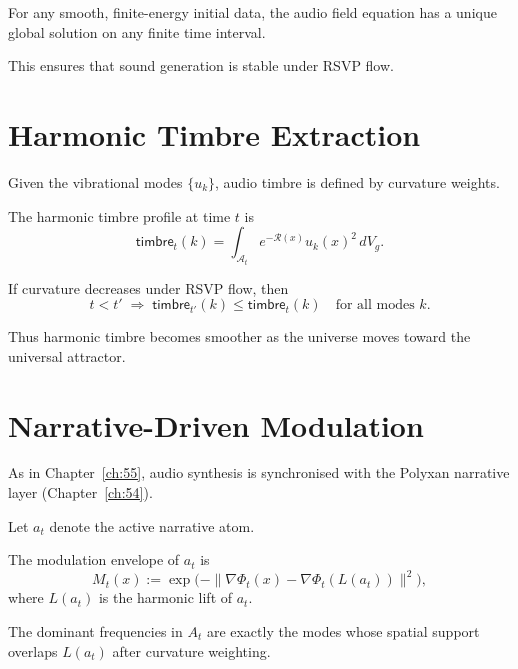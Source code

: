 \begin{theorem}
For any smooth, finite-energy initial data, the audio field equation has a
unique global solution on any finite time interval.
\end{theorem}

This ensures that sound generation is stable under RSVP flow.


\section{Harmonic Timbre Extraction}
\label{sec:56:timbre}

Given the vibrational modes $\{ u_k \}$, audio timbre is defined by curvature
weights.

\begin{definition}
The harmonic timbre profile at time $t$ is
\[
\mathsf{timbre}_t(k)
=
\int_{\mathcal{A}_t} e^{-\mathcal{R}(x)} u_k(x)^2 \, dV_g.
\]
\end{definition}

\begin{theorem}
If curvature decreases under RSVP flow, then
\[
t < t' \;\Longrightarrow\;
\mathsf{timbre}_{t'}(k) \le \mathsf{timbre}_t(k)
\quad
\text{for all modes $k$.}
\]
\end{theorem}

Thus harmonic timbre becomes smoother as the universe moves toward the
universal attractor.


\section{Narrative-Driven Modulation}
\label{sec:56:narrative}

As in Chapter~\ref{ch:55}, audio synthesis is synchronised with the Polyxan
narrative layer (Chapter~\ref{ch:54}).

Let $a_t$ denote the active narrative atom.

\begin{definition}
The modulation envelope of $a_t$ is
\[
M_t(x) :=
\exp\!\bigl( -\|\nabla\Phi_t(x) - \nabla\Phi_t(L(a_t))\|^2 \bigr),
\]
where $L(a_t)$ is the harmonic lift of $a_t$.
\end{definition}

\begin{theorem}
The dominant frequencies in $A_t$ are exactly the modes whose spatial support
overlaps $L(a_t)$ after curvature weighting.
\end{theorem}

